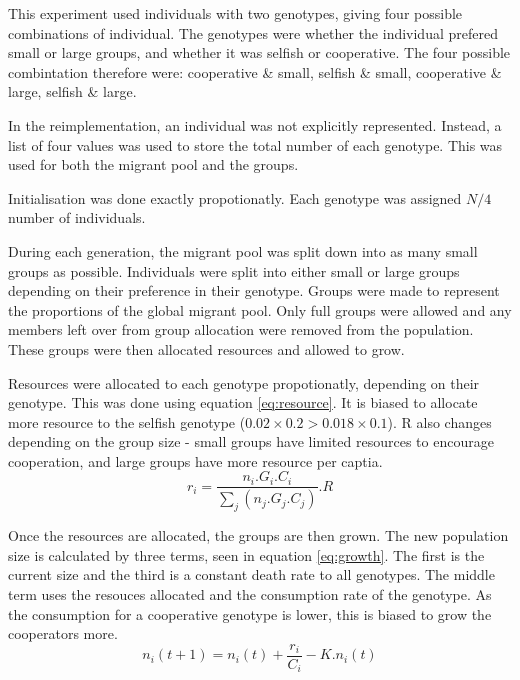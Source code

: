 \documentclass[11pt]{ecsarticle}
\begin{document}
This experiment used individuals with two genotypes, giving four possible combinations of individual.
The genotypes were whether the individual prefered small or large groups, and whether it was selfish or cooperative.
The four possible combintation therefore were: cooperative \& small, selfish \& small, cooperative \& large, selfish \& large. 

In the reimplementation, an individual was not explicitly represented. 
Instead, a list of four values was used to store the total number of each genotype. 
This was used for both the migrant pool and the groups. 

Initialisation was done exactly propotionatly. Each genotype was assigned $N / 4$ number of individuals.

During each generation, the migrant pool was split down into as many small groups as possible.
Individuals were split into either small or large groups depending on their preference in their genotype.
Groups were made to represent the proportions of the global migrant pool. 
Only full groups were allowed and any members left over from group allocation were removed from the population. 
These groups were then allocated resources and allowed to grow. 

Resources were allocated to each genotype propotionatly, depending on their genotype.
This was done using equation \eqref{eq:resource}. 
It is biased to allocate more resource to the selfish genotype ($0.02 \times 0.2 > 0.018 \times 0.1$). 
R also changes depending on the group size - small groups have limited resources to encourage cooperation, and large groups have more resource per captia.
\begin{equation}
 r_i = \frac{ n_i . G_i . C_i }{\sum\limits_j (n_j . G_j . C_j )} . R 
 \label{eq:resource}
\end{equation}

Once the resources are allocated, the groups are then grown. 
The new population size is calculated by three terms, seen in equation \ref{eq:growth}. 
The first is the current size and the third is a constant death rate to all genotypes.
The middle term uses the resouces allocated and the consumption rate of the genotype.
As the consumption for a cooperative genotype is lower, this is biased to grow the cooperators more.
\begin{equation}
 n_i (t + 1) = n_i (t) + \frac{r_i}{C_i} - K.n_i (t)
 \label{eq:growth}
\end{equation}
\end{document}
